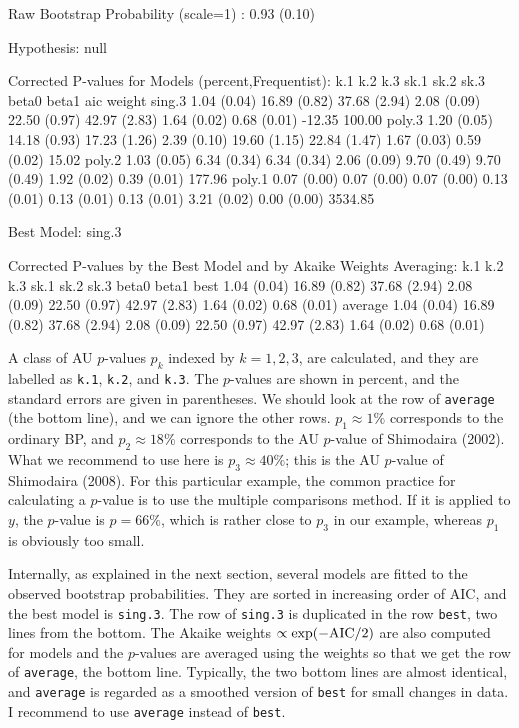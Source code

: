 \documentclass[a4paper]{amsart}
\begin{document}
{\tiny
\begin{Schunk}
\begin{Soutput}
Raw Bootstrap Probability (scale=1) : 0.93 (0.10)

Hypothesis: null 

Corrected P-values for Models (percent,Frequentist):
       k.1         k.2          k.3          sk.1        sk.2         sk.3         beta0       beta1       aic     weight 
sing.3 1.04 (0.04) 16.89 (0.82) 37.68 (2.94) 2.08 (0.09) 22.50 (0.97) 42.97 (2.83) 1.64 (0.02) 0.68 (0.01)  -12.35 100.00 
poly.3 1.20 (0.05) 14.18 (0.93) 17.23 (1.26) 2.39 (0.10) 19.60 (1.15) 22.84 (1.47) 1.67 (0.03) 0.59 (0.02)   15.02        
poly.2 1.03 (0.05)  6.34 (0.34)  6.34 (0.34) 2.06 (0.09)  9.70 (0.49)  9.70 (0.49) 1.92 (0.02) 0.39 (0.01)  177.96        
poly.1 0.07 (0.00)  0.07 (0.00)  0.07 (0.00) 0.13 (0.01)  0.13 (0.01)  0.13 (0.01) 3.21 (0.02) 0.00 (0.00) 3534.85        

Best Model:  sing.3 

Corrected P-values by the Best Model and by Akaike Weights Averaging:
        k.1         k.2          k.3          sk.1        sk.2         sk.3         beta0       beta1       
best    1.04 (0.04) 16.89 (0.82) 37.68 (2.94) 2.08 (0.09) 22.50 (0.97) 42.97 (2.83) 1.64 (0.02) 0.68 (0.01) 
average 1.04 (0.04) 16.89 (0.82) 37.68 (2.94) 2.08 (0.09) 22.50 (0.97) 42.97 (2.83) 1.64 (0.02) 0.68 (0.01) 
\end{Soutput}
\end{Schunk}
}

A class of AU $p$-values $p_k$ indexed by $k=1,2,3$, are calculated,
and they are labelled as {\tt k.1}, {\tt k.2}, and {\tt k.3}.  The
$p$-values are shown in percent, and the standard errors are given in
parentheses.  We should look at the row of {\tt average} (the bottom
line), and we can ignore the other rows.  $p_1\approx 1\%$ corresponds
to the ordinary BP, and $p_2\approx 18\%$ corresponds to the AU
$p$-value of Shimodaira (2002).  What we recommend to use here is
$p_3\approx40\%$; this is the AU $p$-value of Shimodaira (2008).  For
this particular example, the common practice for calculating a
$p$-value is to use the multiple comparisons method. If it is applied
to $y$, the $p$-value is $p=66\%$, which is rather close to $p_3$ in
our example, whereas $p_1$ is obviously too small.

Internally, as explained in the next section, several models are
fitted to the observed bootstrap probabilities. They are sorted in
increasing order of AIC, and the best model is {\tt sing.3}. The row
of {\tt sing.3} is duplicated in the row {\tt best}, two lines from
the bottom. The Akaike weights $\propto \exp(-{\rm AIC}/2)$ are also
computed for models and the $p$-values are averaged using the weights
so that we get the row of {\tt average}, the bottom line. Typically,
the two bottom lines are almost identical, and {\tt average} is
regarded as a smoothed version of {\tt best} for small changes in
data.  I recommend to use {\tt average} instead of {\tt best}.
\end{document}
